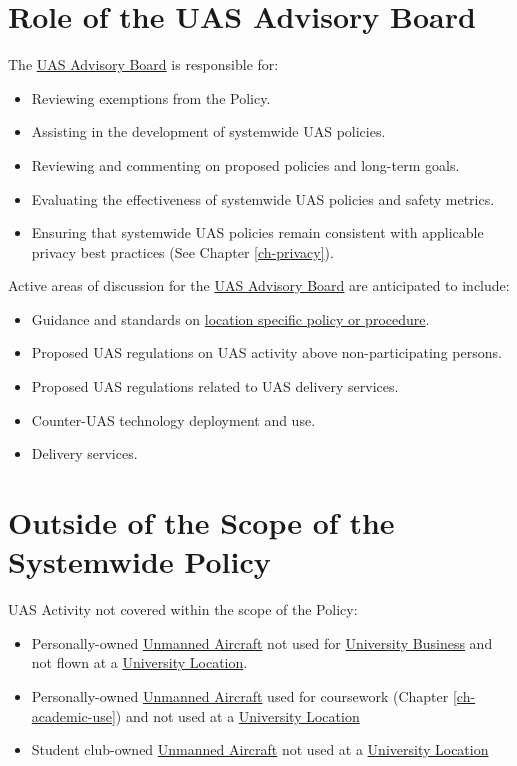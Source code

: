 \documentclass[
]{book}
\providecommand{\tightlist}{%
  \setlength{\itemsep}{0pt}\setlength{\parskip}{0pt}}
\begin{document}
\hypertarget{role-of-the-uas-advisory-board}{%
\section{Role of the UAS Advisory Board}\label{role-of-the-uas-advisory-board}}

The \protect\hyperlink{AB}{UAS Advisory Board} is responsible for:

\begin{itemize}
\tightlist
\item
  Reviewing exemptions from the Policy.
\item
  Assisting in the development of systemwide UAS policies.
\item
  Reviewing and commenting on proposed policies and long-term goals.
\item
  Evaluating the effectiveness of systemwide UAS policies and safety metrics.
\item
  Ensuring that systemwide UAS policies remain consistent with applicable privacy best practices (See Chapter \ref{ch-privacy}).
\end{itemize}

Active areas of discussion for the \protect\hyperlink{AB}{UAS Advisory Board} are anticipated to include:

\begin{itemize}
\tightlist
\item
  Guidance and standards on \protect\hyperlink{LSP}{location specific policy or procedure}.
\item
  Proposed UAS regulations on UAS activity above non-participating persons.
\item
  Proposed UAS regulations related to UAS delivery services.
\item
  Counter-UAS technology deployment and use.
\item
  Delivery services.
\end{itemize}

\hypertarget{outside-of-the-scope-of-the-systemwide-policy}{%
\section{Outside of the Scope of the Systemwide Policy}\label{outside-of-the-scope-of-the-systemwide-policy}}

UAS Activity not covered within the scope of the Policy:

\begin{itemize}
\tightlist
\item
  Personally-owned \protect\hyperlink{UA}{Unmanned Aircraft} not used for \protect\hyperlink{UB}{University Business} and not flown at a \protect\hyperlink{UL}{University Location}.
\item
  Personally-owned \protect\hyperlink{UA}{Unmanned Aircraft} used for coursework (Chapter \ref{ch-academic-use}) and not used at a \protect\hyperlink{UL}{University Location}
\item
  Student club-owned \protect\hyperlink{UA}{Unmanned Aircraft} not used at a \protect\hyperlink{UL}{University Location}
\end{itemize}
\end{document}
